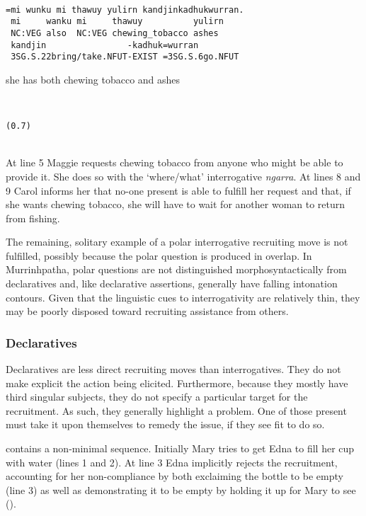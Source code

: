 \documentclass[output=paper,nonflat,colorlinks,citecolor=brown]{langsci/langscibook}
\begin{document}
%
\begin{transbox}{9}{~}
\begin{verbatim}
=mi wunku mi thawuy yulirn kandjinkadhukwurran.
 mi     wanku mi     thawuy          yulirn
 NC:VEG also  NC:VEG chewing_tobacco ashes
 kandjin                -kadhuk=wurran
 3SG.S.22bring/take.NFUT-EXIST =3SG.S.6go.NFUT
\end{verbatim}
\hspace{0.07cm} she has both chewing tobacco and ashes
\end{transbox}
%
\begin{transbox}{10}{~}
\begin{verbatim}
(0.7)
\end{verbatim}
\end{transbox}\\

At line 5 Maggie requests chewing tobacco from anyone who might be able to provide it. She does so with the ‘where/what’ interrogative \textit{ngarra}. At lines 8 and 9 Carol informs her that no-one present is able to fulfill her request and that, if she wants chewing tobacco, she will have to wait for another woman to return from fishing.

The remaining, solitary example of a polar interrogative recruiting move is not fulfilled, possibly because the polar question is produced in overlap. In Murrinhpatha, polar questions are not distinguished morphosyntactically from declaratives and, like declarative assertions, generally have falling intonation contours. Given that the linguistic cues to interrogativity are relatively thin, they may be poorly disposed toward recruiting assistance from others.

\subsubsection{Declaratives}

Declaratives are less direct recruiting moves than interrogatives. They do not make explicit the action being elicited. Furthermore, because they mostly have third singular subjects, they do not specify a particular target for the recruitment. As such, they generally highlight a problem. One of those present must take it upon themselves to remedy the issue, if they see fit to do so. %

 contains a non-minimal sequence. Initially Mary tries to get Edna to fill her cup with water (lines 1 and 2). At line 3 Edna implicitly rejects the recruitment, accounting for her non-compliance by both exclaiming the bottle to be empty (line 3) as well as demonstrating it to be empty by holding it up for Mary to see ().
\end{document}
